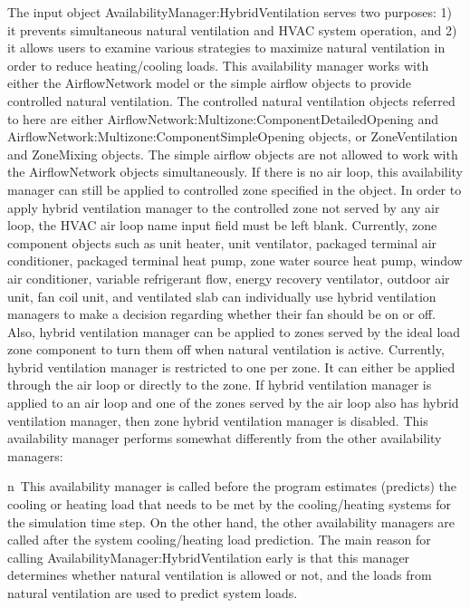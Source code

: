 The input object AvailabilityManager:HybridVentilation serves two purposes: 1) it prevents simultaneous natural ventilation and HVAC system operation, and 2) it allows users to examine various strategies to maximize natural ventilation in order to reduce heating/cooling loads. This availability manager works with either the AirflowNetwork model or the simple airflow objects to provide controlled natural ventilation. The controlled natural ventilation objects referred to here are either AirflowNetwork:Multizone:ComponentDetailedOpening and AirflowNetwork:Multizone:ComponentSimpleOpening objects, or ZoneVentilation and ZoneMixing objects. The simple airflow objects are not allowed to work with the AirflowNetwork objects simultaneously. If there is no air loop, this availability manager can still be applied to controlled zone specified in the object. In order to apply hybrid ventilation manager to the controlled zone not served by any air loop, the HVAC air loop name input field must be left blank. Currently, zone component objects such as unit heater, unit ventilator, packaged terminal air conditioner, packaged terminal heat pump, zone water source heat pump, window air conditioner, variable refrigerant flow, energy recovery ventilator, outdoor air unit, fan coil unit, and ventilated slab can individually use hybrid ventilation managers to make a decision regarding whether their fan should be on or off. Also, hybrid ventilation manager can be applied to zones served by the ideal load zone component to turn them off when natural ventilation is active. Currently, hybrid ventilation manager is restricted to one per zone. It can either be applied through the air loop or directly to the zone. If hybrid ventilation manager is applied to an air loop and one of the zones served by the air loop also has hybrid ventilation manager, then zone hybrid ventilation manager is disabled. This availability manager performs somewhat differently from the other availability managers:

n~This availability manager is called before the program estimates (predicts) the cooling or heating load that needs to be met by the cooling/heating systems for the simulation time step. On the other hand, the other availability managers are called after the system cooling/heating load prediction. The main reason for calling AvailabilityManager:HybridVentilation early is that this manager determines whether natural ventilation is allowed or not, and the loads from natural ventilation are used to predict system loads.

